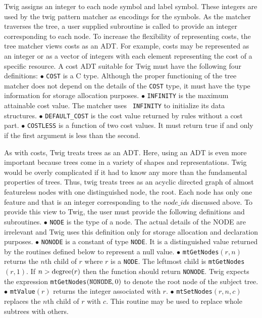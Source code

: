 Twig assigns an integer to each node symbol and label symbol.  These
integers are used by the twig pattern matcher as encodings for the
symbols.
As the matcher traverses the
tree, a user supplied subroutine is called to provide an integer
corresponding to each node.
\medskip
{}
To increase the flexibility of representing costs, the tree matcher
views costs as an ADT.
For example, costs may be represented as an integer or
as a vector of integers with each element representing the cost of a specific
resource.
A cost ADT suitable for Twig must have the following four definitions:
\medskip
\noindent$\bullet$ {\tt COST} is a C type.
Although the proper functioning of the tree matcher
does not depend on the details of the {\tt COST} type, it must have
the type information for storage allocation purposes.
\smallskip
\noindent$\bullet$
{\tt INFINITY} is the maximum attainable cost value.  The matcher uses {\tt
INFINITY} to initialize its data structures.
\smallskip\noindent$\bullet$
{\tt DEFAULT\_COST} is the cost
value returned by rules without a cost part.
\smallskip\noindent$\bullet$
{\tt COSTLESS} is a function of
two cost values.  It must return true if and only if the first argument is
less than the second.
\medskip
{}

As with costs, Twig treats trees as an ADT.  Here, using an ADT is
even more important because trees come in a variety of shapes and
representations.
Twig would be overly complicated if it had to
know any more than the fundamental properties of trees.  Thus,
twig treats trees as an acyclic directed
graph of almost featureless nodes with one
distinguished node, the root.  Each node has only one feature and that
is an integer corresponding to the $node\_id$\/s discussed above.
To provide this
view to Twig, the user must provide the following definitions and
subroutines.
\medskip
\noindent$\bullet$ {\tt NODE} is the type of a node.  The actual
details of
the NODE are irrelevant and Twig uses this definition only for storage
allocation and declaration purposes.
\smallskip
\noindent$\bullet$ {\tt NONODE} is a constant of type
{\tt NODE}.  It is a distinguished
value returned by the routines defined below to represent a null value.
\smallskip
\noindent$\bullet$
{\tt mtGetNodes$(r,n)$} returns the $n$th child of $r$ where $r$
is a {\tt NODE}.  The
leftmost child is {\tt mtGetNodes}$(r,1)$.  If $n > \hbox{degree}(r)$
then the function should return {\tt NONODE}.  Twig expects the
expression {\tt mtGetNodes}$({\tt NONODE}, 0)$
to denote the root node of
the subject tree.
\smallskip
\noindent$\bullet$
{\tt mtValue$(r)$} returns the integer associated with $r$.
\smallskip
\noindent$\bullet$
{\tt mtSetNodes$(r,n,c)$} replaces the $n$th child of $r$ with
$c$.  This routine may be used to replace whole subtrees with others.
\medskip
{}

